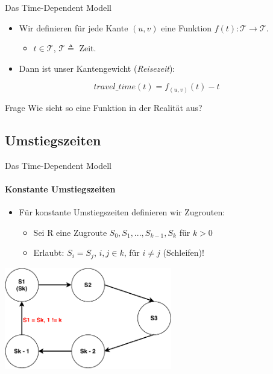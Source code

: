 \begin{frame}{Das Time-Dependent Modell}
	\begin{itemize}
		\item Wir definieren für jede Kante $(u,v)$ eine\* Funktion $f(t): \mathcal{T} \rightarrow \mathcal{T}$.
		\begin{itemize}
			\item $t \in \mathcal{T}$, $\mathcal{T} \triangleq$ Zeit.
		\end{itemize}
	\end{itemize}
	\vspace{2em}
	\pause
	\begin{itemize}
		\item Dann ist unser Kantengewicht (\textit{Reisezeit}):
	\end{itemize}
	
	\begin{equation*}
		travel\_time(t) = f_{(u,v)}(t) - t
	\end{equation*}

	\vspace{4em}
	\begin{block}{Frage}
		Wie sieht so eine Funktion in der Realität aus?
	\end{block}
\end{frame}

\subsection{Umstiegszeiten}
\begin{frame}{Das Time-Dependent Modell}
	\framesubtitle{Konstante Umstiegszeiten}
	\begin{itemize}
		\item Für konstante Umstiegszeiten definieren wir Zugrouten:
		\begin{itemize}
			\item Sei R eine Zugroute $S_0,S_1,...,S_{k - 1}, S_k$ für $k > 0$
			\pause
			\item Erlaubt: $S_i = S_j$, $i,j \in k$, für $i \neq j$ (Schleifen)!
		\end{itemize}
	\end{itemize}
	
	\begin{center}
		\includegraphics[height=12em]{images/time-dependent/zugroute.pdf}
	\end{center}
\end{frame}


